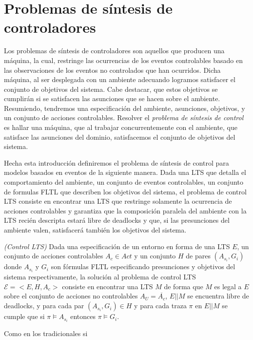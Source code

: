 \section{Problemas de síntesis de controladores}

Los problemas de síntesis de controladores son aquellos que producen una máquina, la cual, restringe las ocurrencias de
los eventos controlables basado en las observaciones de los eventos no controlados que han ocurridos. Dicha máquina, al
ser desplegada con un ambiente adecuando logramos satisfacer el conjunto de objetivos del sistema. Cabe destacar, que
estos objetivos se cumplirán si se satisfacen las asunciones que se hacen sobre el ambiente. Resumiendo, tendremos una
especificación del ambiente, asunciones, objetivos, y un conjunto de acciones controlables. Resolver el \emph{problema
de síntesis de control} es hallar una máquina, que al trabajar concurrentemente con el ambiente, que satisface las
asunciones del dominio, satisfacemos el conjunto de objetivos del sistema.

Hecha esta introducción definiremos el problema de síntesis de control para modelos basados en eventos de la siguiente
manera. Dada una LTS que detalla el comportamiento del ambiente, un conjunto de eventos controlables, un conjunto de
formulas FLTL que describen los objetivos del sistema, el problema de control LTS consiste en encontrar una LTS que
restringe solamente la ocurrencia de acciones controlables y garantiza que la composición paralela del ambiente con la
LTS recién descripta estará libre de deadlocks y que, si las presunciones del ambiente valen, satisfacerá también los
objetivos del sistema.

\begin{nahaDef}
    \emph{(Control LTS)} Dada una especificación de un entorno en forma de una LTS $E$, un conjunto de acciones
    controlables $A_c \in Act$ y un conjunto $H$ de pares $(A_{s_i}, G_i)$ donde $A_{s_i}$ y $G_i$ son fórmulas FLTL
    especificando presunciones y objetivos del sistema respectivamente, la solución al problema de control LTS
    $\mathcal{E} = <E,H,A_c>$ consiste en encontrar una LTS $M$ de forma que $M$ es legal a $E$ sobre el conjunto de acciones
    no controlables $A_U = \overline{A_c}$, $E||M$ se encuentra libre de deadlocks, y para cada par $(A_{s_i}, G_i) \in
    H$ y para cada traza $\pi$ en $E||M$ se cumple que si $\pi \vDash A_{s_i}$ entonces $\pi \vDash G_i$.
\end{nahaDef}

Como en los tradicionales si

